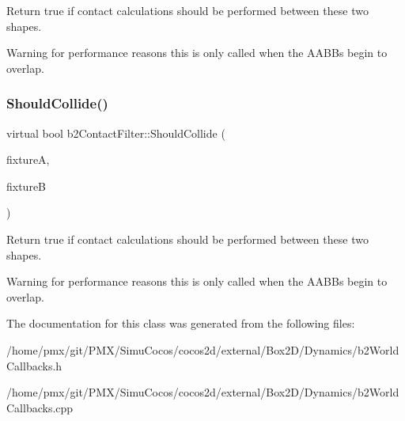 Return true if contact calculations should be performed between these two shapes. \begin{DoxyWarning}{Warning}
for performance reasons this is only called when the A\+A\+B\+Bs begin to overlap. 
\end{DoxyWarning}
\mbox{\label{classb2ContactFilter_a0e33d4fc90a9345160a07cc494b45ecd}} 
\subsubsection{\texorpdfstring{Should\+Collide()}{ShouldCollide()}\hspace{0.1cm}{\footnotesize\ttfamily [2/2]}}
{\footnotesize\ttfamily virtual bool b2\+Contact\+Filter\+::\+Should\+Collide (\begin{DoxyParamCaption}\item[{\hyperlink{classb2Fixture}{b2\+Fixture} $\ast$}]{fixtureA,  }\item[{\hyperlink{classb2Fixture}{b2\+Fixture} $\ast$}]{fixtureB }\end{DoxyParamCaption})\hspace{0.3cm}{\ttfamily [virtual]}}

Return true if contact calculations should be performed between these two shapes. \begin{DoxyWarning}{Warning}
for performance reasons this is only called when the A\+A\+B\+Bs begin to overlap. 
\end{DoxyWarning}


The documentation for this class was generated from the following files\+:\begin{DoxyCompactItemize}
\item 
/home/pmx/git/\+P\+M\+X/\+Simu\+Cocos/cocos2d/external/\+Box2\+D/\+Dynamics/b2\+World\+Callbacks.\+h\item 
/home/pmx/git/\+P\+M\+X/\+Simu\+Cocos/cocos2d/external/\+Box2\+D/\+Dynamics/b2\+World\+Callbacks.\+cpp\end{DoxyCompactItemize}
